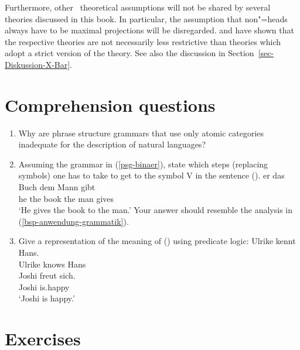 Furthermore, other \xbar~theoretical assumptions will not be shared by several theories discussed in this book. In particular, the assumption that non"=heads always have
to be maximal projections will be disregarded. \citet{Pullum85a} and
\citet{KP90a} have shown that the respective theories are not necessarily less restrictive
than theories which adopt a strict version of the \xbar theory. See also the discussion in Section~\ref{sec-Diskussion-X-Bar}.

\section*{Comprehension questions}

\begin{enumerate}
\item Why are phrase structure grammars that use only atomic categories inadequate for the description of natural languages?
\item Assuming the grammar in (\ref{psg-binaer}), state which steps (replacing symbols) one has to take to get to the symbol 
	 V in the sentence ().
\ea
\gll er das Buch dem Mann gibt\\
	 he the book the man gives\\
\glt `He gives the book to the man.'
\z
Your answer should resemble the analysis in (\ref{bsp-anwendung-grammatik}).
\item Give a representation of the meaning of () using predicate logic:
\eal
\ex 
\gll Ulrike kennt Hans.\\
	 Ulrike knows Hans\\
\ex 
\gll Joshi freut sich.\\
	 Joshi is.happy \\
\glt `Joshi is happy.'
\zl
\end{enumerate}


\section*{Exercises}

